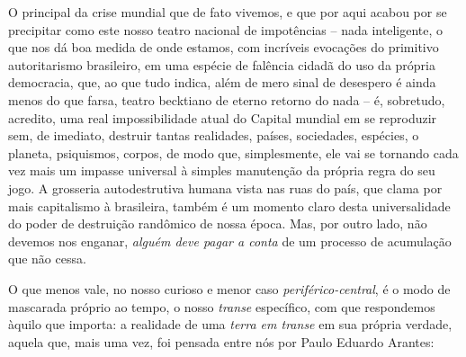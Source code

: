 O principal da crise mundial que de fato vivemos, e que por aqui acabou
por se precipitar como este nosso teatro nacional de impotências -- nada
inteligente, o que nos dá boa medida de onde estamos, com incríveis
evocações do primitivo autoritarismo brasileiro, em uma espécie de
falência cidadã do uso da própria democracia, que, ao que tudo indica,
além de mero sinal de desespero é ainda menos do que farsa, teatro
becktiano de eterno retorno do nada -- é, sobretudo, acredito, uma real
impossibilidade atual do Capital mundial em se reproduzir sem, de
imediato, destruir tantas realidades, países, sociedades, espécies, o
planeta, psiquismos, corpos, de modo que, simplesmente, ele vai se
tornando cada vez mais um impasse universal à simples manutenção da
própria regra do seu jogo. A grosseria autodestrutiva humana vista nas
ruas do país, que clama por mais capitalismo à brasileira, também é um
momento claro desta universalidade do poder de destruição randômico de
nossa época. Mas, por outro lado, não devemos nos enganar, \emph{alguém
deve pagar a conta} de um processo de acumulação que não cessa.

O que menos vale, no nosso curioso e menor caso
\emph{periférico-central}, é o modo de mascarada próprio ao tempo, o
nosso \emph{transe} específico, com que respondemos àquilo que importa:
a realidade de uma \emph{terra em transe} em sua própria verdade, aquela
que, mais uma vez, foi pensada entre nós por Paulo Eduardo Arantes:

